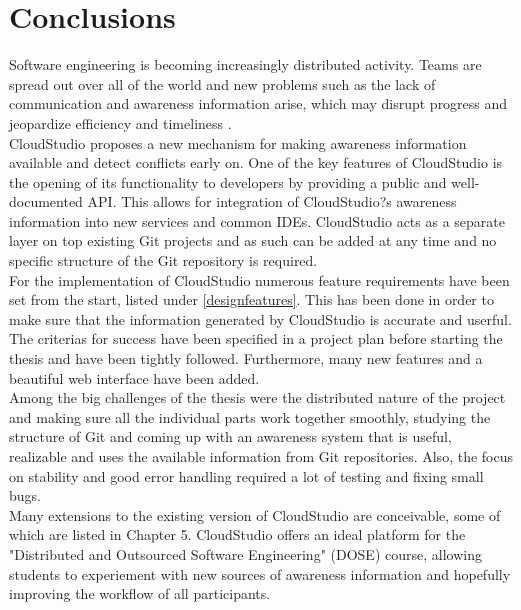 

\chapter{Conclusions}\label{conclusions}






Software engineering is becoming increasingly distributed activity. Teams are spread out over all of the world and new problems such as the lack of communication and awareness information arise, which may disrupt progress and jeopardize efficiency and timeliness \cite{ref3}. \\

CloudStudio proposes a new mechanism for making awareness information available and detect conflicts early on. One of the key features of CloudStudio is the opening of its functionality to developers by providing a public and well-documented API. This allows for integration of CloudStudio?s awareness information into new services and common IDEs. CloudStudio acts as a separate layer on top existing Git projects and as such can be added at any time and no specific structure of the Git repository is required. \\

For the implementation of CloudStudio numerous feature requirements have been set from the start, listed under \ref{designfeatures}. This has been done in order to make sure that the information generated by CloudStudio is accurate and userful. The criterias for success have been specified in a project plan before starting the thesis and have been tightly followed. Furthermore, many new features and a beautiful web interface have been added. \\

Among the big challenges of the thesis were the distributed nature of the project and making sure all the individual parts work together smoothly, studying the structure of Git and coming up with an awareness system that is useful, realizable and uses the available information from Git repositories. Also, the focus on stability and good error handling required a lot of testing and fixing small bugs. \\

Many extensions to the existing version of CloudStudio are conceivable, some of which are listed in Chapter 5. CloudStudio offers an ideal platform for the "Distributed and Outsourced Software Engineering" (DOSE) course, allowing students to experiement with new sources of awareness information and hopefully improving the workflow of all participants.



